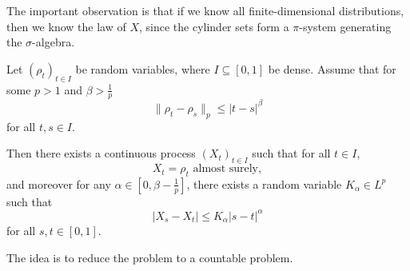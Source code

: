 \documentclass[a4paper]{article}
\begin{document}
The important observation is that if we know all finite-dimensional distributions, then we know the law of $X$, since the cylinder sets form a $\pi$-system generating the $\sigma$-algebra.

\begin{thm}
  Let $(\rho_t)_{t \in I}$ be random variables, where $I \subseteq [0, 1]$ be dense. Assume that for some $p > 1$ and $\beta > \frac{1}{p}$
  \[
    \|\rho_t - \rho_s\|_p \leq |t - s|^\beta\tag{$*$}
  \]
  for all $t, s \in I$.

  Then there exists a continuous process $(X_t)_{t \in I}$ such that for all $t \in I$,
  \[
    X_t = \rho_t \text{ almost surely},
  \]
  and moreover for any $\alpha \in [0, \beta - \frac{1}{p}]$, there exists a random variable $K_\alpha \in L^p$ such that
  \[
    |X_s - X_t| \leq K_\alpha |s - t|^\alpha
  \]
  for all $s, t \in [0, 1]$.
\end{thm}
The idea is to reduce the problem to a countable problem.
\end{document}
